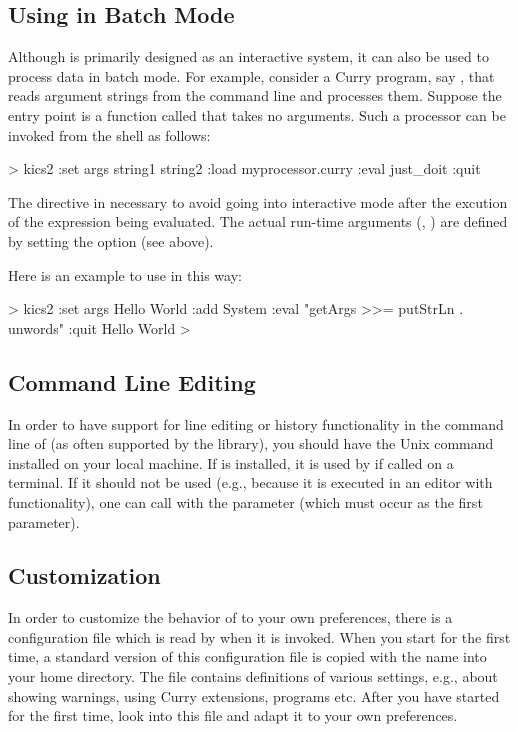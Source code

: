 \subsection{Using \CYS in Batch Mode}

Although \CYS is primarily designed as an interactive system,
it can also be used to process data in batch mode.
For example, consider a Curry program, say , that
reads argument strings from the command line and processes them.
Suppose the entry point is a function called 
that takes no arguments. Such a processor can be invoked from
the shell as follows:
\begin{curry}
> kics2 :set args string1 string2 :load myprocessor.curry :eval just_doit :quit
\end{curry}
The  directive in necessary to avoid \CYS going
into interactive mode after the
excution of the expression being evaluated.
The actual run-time arguments (, )
are defined by setting the option  (see above).

Here is an example to use \CYS in this way:
\begin{curry}
> kics2 :set args Hello World :add System :eval "getArgs >>= putStrLn . unwords" :quit
Hello World
>
\end{curry}


\subsection{Command Line Editing}
\label{sec-readline}

In order to have support for line editing or history functionality
in the command line of \CYS (as often supported by the 
library), you should have the Unix command  installed
on your local machine.
If  is installed, it is used by \CYS if called on a terminal.
If it should not be used (e.g., because it is executed
in an editor with  functionality), one can
call \CYS with the parameter 
(which must occur as the first parameter).


\subsection{Customization}
\label{sec-customization}

In order to customize the behavior of \CYS to your own preferences,
there is a configuration file which is read by \CYS when it is invoked.
When you start \CYS for the first time, a standard version of
this configuration file is copied with the name
into your home directory. The file contains definitions
of various settings, e.g., about showing warnings, using Curry extensions,
programs etc.
After you have started \CYS for the first time, look into this file
and adapt it to your own preferences.


